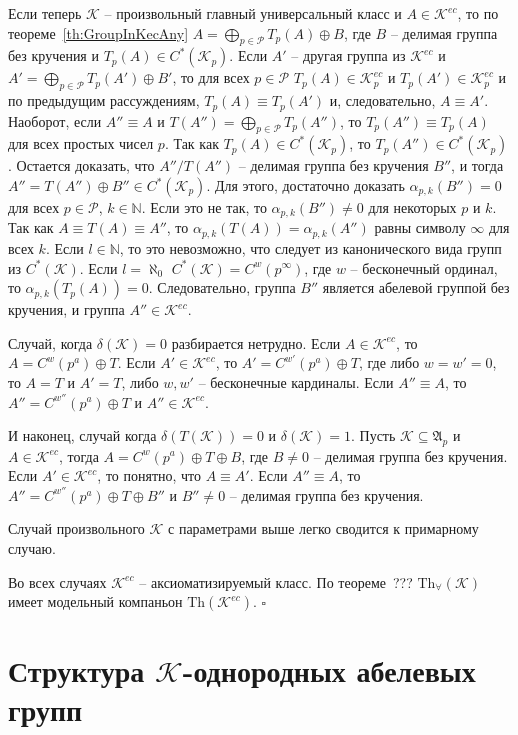 \documentclass[12pt]{extarticle} %
\def\A{{\mathfrak{A}}}
\def\K{{\mathcal{K}}}
\def\Kec{\mathcal{K}^{ec}}
\def\P{{\mathcal{P}}}
\def\N{{\mathbb{N}}}
\def\Th{{\mathrm{Th}}}
\def\Tha{{\mathrm{Th}_\forall}}
\begin{document}
Если теперь $\K$ -- произвольный главный универсальный класс и $A \in \Kec$, то по теореме~\ref{th:GroupInKecAny} $A = \bigoplus\limits_{p \in \P} T_p(A) \oplus B$, где $B$ -- делимая группа без кручения и $T_p(A) \in C^*(\K_p)$. Если $A'$ -- другая группа из $\Kec$ и $A' = \bigoplus\limits_{p \in \P} T_p(A') \oplus B'$, то для всех $p \in \P$ $T_p(A) \in \Kec_p$ и $T_p(A') \in \Kec_p$ и по предыдущим рассуждениям, $T_p(A) \equiv T_p(A')$ и, следовательно, $A \equiv A'$. Наоборот, если $A'' \equiv A$ и $T(A'') = \bigoplus\limits_{p \in \P} T_p(A'')$, то $T_p(A'') \equiv T_p(A)$ для всех простых чисел $p$. Так как $T_p(A) \in C^*(\K_p)$, то $T_p(A'') \in C^*(\K_p)$. Остается доказать, что $A'' \Big/ T(A'')$ -- делимая группа без кручения $B''$, и тогда $A'' = T(A'') \oplus B'' \in C^*(\K_p)$. Для этого, достаточно доказать $\alpha_{p,k}(B'') = 0$ для всех $p \in \P$, $k \in \N$. Если это не так, то $\alpha_{p,k}(B'') \neq 0$ для некоторых $p$ и $k$. Так как $A \equiv T(A) \equiv A''$, то $\alpha_{p,k}(T(A)) = \alpha_{p,k}(A'')$ равны символу $\infty$ для всех $k$. Если $l \in \N$, то это невозможно, что следует из канонического вида групп из $C^*(\K)$. Если $l = \aleph_0$ $C^*(\K) = C^w(p^\infty)$, где $w$ -- бесконечный ординал, то $\alpha_{p,k}(T_p(A)) = 0$. Следовательно, группа $B''$ является абелевой группой без кручения, и группа $A'' \in \Kec$.

Случай, когда $\delta(\K) = 0$ разбирается нетрудно. Если $A \in \Kec$, то $A = C^w(p^a) \oplus T$. Если $A' \in \Kec$, то $A' = C^{w'}(p^a) \oplus T$, где либо $w = w' = 0$, то $A = T$ и $A' = T$, либо $w, w'$ -- бесконечные кардиналы. Если $A'' \equiv A$, то $A'' = C^{w''}(p^a) \oplus T$ и $A'' \in \Kec$.

И наконец, случай когда $\delta(T(\K)) = 0$ и $\delta(\K) = 1$. Пусть $\K \subseteq \A_p$ и $A \in \Kec$, тогда $A = C^w(p^a) \oplus T \oplus B$, где $B \neq 0$ -- делимая группа без кручения. Если $A' \in \Kec$, то понятно, что $A \equiv A'$. Если $A'' \equiv A$, то $A'' = C^{w''}(p^a) \oplus T \oplus B''$ и $B'' \neq 0$ -- делимая группа без кручения.

Случай произвольного $\K$ с параметрами выше легко сводится к примарному случаю. 

Во всех случаях $\Kec$ -- аксиоматизируемый класс. По теореме~???  \cite{Mac} $\Tha(\K)$ имеет модельный компаньон $\Th(\Kec)$. $\square$



\section{Структура $\K$-однородных абелевых групп}
\end{document}
